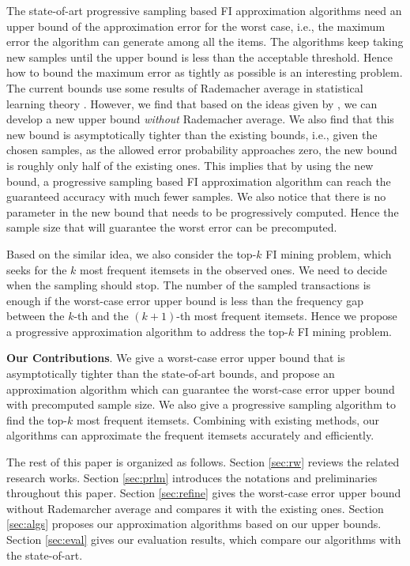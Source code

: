 \documentclass{article}
\begin{document}
The state-of-art progressive sampling based FI approximation algorithms \cite{RU15} need an upper bound of the approximation error for the worst case, i.e., the maximum error the algorithm can generate among all the items. The algorithms keep taking new samples until the upper bound is less than the acceptable threshold. Hence how to bound the maximum error as tightly as possible is an interesting problem. The current bounds use some results of Rademacher average in statistical learning theory \cite{Vap98,Vap13,BBL04,BBL05}. 
However, we find that based on the ideas given by \cite{BBL04,Toi96}, we can develop a new upper bound \emph{without} Rademacher average. 
We also find that this new bound is asymptotically tighter than the existing bounds, i.e., given the chosen samples, as the allowed error probability approaches zero, the new bound is roughly only half of the existing ones. This implies that by using the new bound, a progressive sampling based FI approximation algorithm can reach the guaranteed accuracy with much fewer samples. We also notice that there is no parameter in the new bound that needs to be progressively computed. Hence the sample size that will guarantee the worst error can be precomputed.

Based on the similar idea, we also consider the top-$k$ FI mining problem, which seeks for the $k$ most frequent itemsets in the observed ones. We need to decide when the sampling should stop. The number of the sampled transactions is enough if the worst-case error upper bound is less than the frequency gap between the $k$-th and the $(k+1)$-th most frequent itemsets. Hence we propose a progressive approximation algorithm to address the top-$k$ FI mining problem.

{\bf Our Contributions}. We give a worst-case error upper bound that is asymptotically tighter than the state-of-art bounds, and propose an approximation algorithm which can guarantee the worst-case error upper bound with precomputed sample size. We also give a progressive sampling algorithm to find the top-$k$ most frequent itemsets. Combining with existing methods, our algorithms can approximate the frequent itemsets accurately and efficiently.

The rest of this paper is organized as follows. Section \ref{sec:rw} reviews the related research works. Section \ref{sec:prlm} introduces the notations and preliminaries throughout this paper. Section \ref{sec:refine} gives the worst-case error upper bound without Rademarcher average and compares it with the existing ones. Section \ref{sec:algs} proposes our approximation algorithms based on our upper bounds. Section \ref{sec:eval} gives our evaluation results, which compare our algorithms with the state-of-art.
\end{document}
